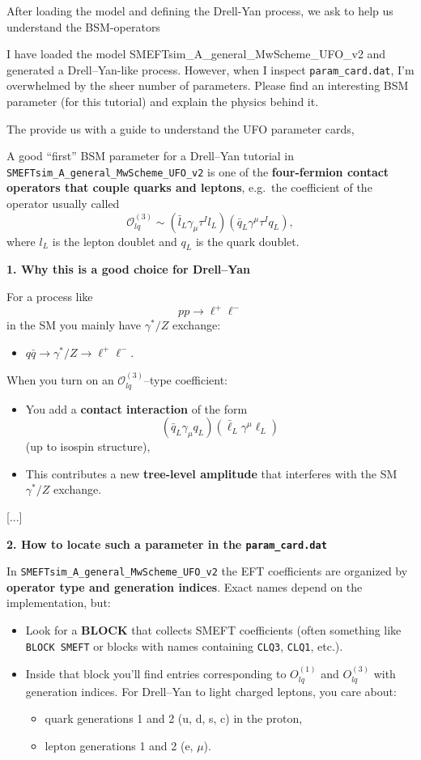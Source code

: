 \documentclass[submission, Phys]{SciPost}
\begin{document}
%
After loading the model and defining the Drell-Yan process, we ask \ma to help us understand the BSM-operators
%
\begin{userblock}[User]
I have loaded the model SMEFTsim\_A\_general\_MwScheme\_UFO\_v2 and generated a Drell–Yan-like process. However, when I inspect \lstinline|param_card.dat|, I’m overwhelmed by the sheer number of parameters. Please find an interesting BSM parameter (for this tutorial) and explain the physics behind it.
\end{userblock}
%
The \ma provide us with a guide to understand the UFO parameter cards,
%
\begin{promptblock}[\ma (shortened)]
A good ``first'' BSM parameter for a Drell--Yan tutorial in \lstinline|SMEFTsim_A_general_MwScheme_UFO_v2| is one of the \textbf{four-fermion contact operators that couple quarks and leptons}, e.g.\ the coefficient of the operator usually called
\[
\mathcal O_{lq}^{(3)} \sim (\bar l_L \gamma_\mu \tau^I l_L)(\bar q_L \gamma^\mu \tau^I q_L),
\]
where $l_L$ is the lepton doublet and $q_L$ is the quark doublet.

\textbf{1. Why this is a good choice for Drell--Yan}

For a process like
\[
pp \to \ell^+ \ell^-
\]
in the SM you mainly have $\gamma^*/Z$ exchange:
\begin{itemize}
\item $q \bar q \to \gamma^*/Z \to \ell^+ \ell^-.$
\end{itemize}

When you turn on an $\mathcal O_{lq}^{(3)}$--type coefficient:
\begin{itemize}
\item You add a \textbf{contact interaction} of the form
\[
(\bar q_L \gamma_\mu q_L)(\bar \ell_L \gamma^\mu \ell_L)
\]
(up to isospin structure),
\item This contributes a new \textbf{tree-level amplitude} that interferes with the SM $\gamma^*/Z$ exchange.
\end{itemize}

[...]

\textbf{2. How to locate such a parameter in the \lstinline|param_card.dat|}

In \lstinline|SMEFTsim_A_general_MwScheme_UFO_v2| the EFT coefficients are organized by \textbf{operator type and generation indices}. Exact names depend on the implementation, but:
\begin{itemize}
\item Look for a \textbf{BLOCK} that collects SMEFT coefficients (often something like \lstinline|BLOCK SMEFT| or blocks with names containing \lstinline|CLQ3|, \lstinline|CLQ1|, etc.).
\item Inside that block you’ll find entries corresponding to $O_{lq}^{(1)}$ and $O_{lq}^{(3)}$ with generation indices. For Drell--Yan to light charged leptons, you care about:
\begin{itemize}
\item quark generations 1 and 2 (u, d, s, c) in the proton,
\item lepton generations 1 and 2 (e, $\mu$).
\end{itemize}
\end{itemize}


\end{promptblock}
\end{document}
